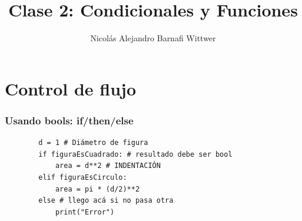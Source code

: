 \documentclass[14pt,aspectratio=169,xcolor=dvipsnames]{beamer}
\title[short title]{Clase 2: Condicionales y Funciones}
\subtitle{}
\author[NA Barnafi] {Nicolás Alejandro Barnafi Wittwer}
\institute[UC|CMM] 
{
    Pontificia Universidad Católica de Chile \\
    Centro de Modelamiento Matemático
}
\date{}
\begin{document}
\begin{frame}
    \maketitle
\end{frame}
\section{Control de flujo}
\begin{frame}[fragile]\frametitle{Usando bools: if/then/else}

    \begin{verbatim}
        d = 1 # Diámetro de figura
        if figuraEsCuadrado: # resultado debe ser bool
            area = d**2 # INDENTACIÓN
        elif figuraEsCirculo:
            area = pi * (d/2)**2
        else # llego acá si no pasa otra
            print("Error")
    \end{verbatim}    
\end{frame}
\end{document}
